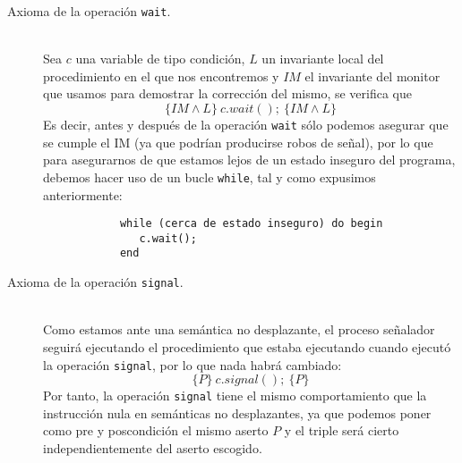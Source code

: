 \begin{description}
    \item [Axioma de la operación \texttt{wait}.]~\\
        Sea $c$ una variable de tipo condición, $L$ un invariante local del procedimiento en el que nos encontremos y $IM$ el invariante del monitor que usamos para demostrar la corrección del mismo, se verifica que
        \begin{equation*}
            \{IM \land L\}\ c.wait();\ \{IM \land L\}
        \end{equation*}
        Es decir, antes y después de la operación \verb|wait| sólo podemos asegurar que se cumple el IM (ya que podrían producirse robos de señal), por lo que para asegurarnos de que estamos lejos de un estado inseguro del programa, debemos hacer uso de un bucle \verb|while|, tal y como expusimos anteriormente:
        \begin{verbatim}
            while (cerca de estado inseguro) do begin
               c.wait();
            end
        \end{verbatim}
    \item [Axioma de la operación \texttt{signal}.]~\\
        Como estamos ante una semántica no desplazante, el proceso señalador seguirá ejecutando el procedimiento que estaba ejecutando cuando ejecutó la operación \verb|signal|, por lo que nada habrá cambiado:
        \begin{equation*}
            \{P\}\ c.signal();\ \{P\}
        \end{equation*}
        Por tanto, la operación \verb|signal| tiene el mismo comportamiento que la instrucción nula en semánticas no desplazantes, ya que podemos poner como pre y poscondición el mismo aserto $P$ y el triple será cierto independientemente del aserto escogido.
\end{description}

